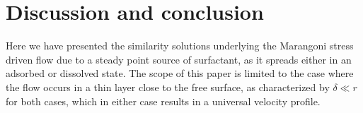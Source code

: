 \documentclass[]{jfm}
\newcommand{\Sc}{\text{Sc}}
\begin{document}
\section{Discussion and conclusion}
\label{sec:conclusion}
Here we have presented the similarity solutions underlying the Marangoni stress driven flow due to a steady point source of surfactant, as it spreads either in an adsorbed or dissolved state.
The scope of this paper is limited to the case where the flow occurs in a thin layer close to the free surface, as characterized by $\delta \ll r$ for both cases, which in either case results in a universal velocity profile.

\end{document}
